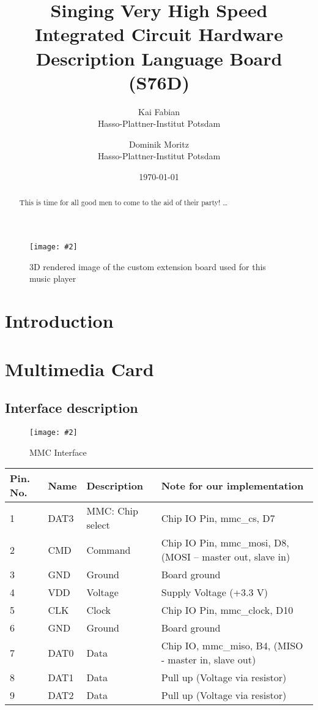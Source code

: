 \documentclass[12pt, a4paper]{article}
\title{Singing Very High Speed Integrated Circuit Hardware Description Language Board (S76D)}
\author{
        Kai Fabian \\
        Hasso-Plattner-Institut Potsdam\\
            \and
        Dominik Moritz \\
        Hasso-Plattner-Institut Potsdam\\
}
\date{\today}
\newcommand{\image}[5]{
	\begin{figure}[#4]               %
		\centering                     %
		\texttt{[image: \#2]} %
		\caption{#3}                   %
		\label{fig:#5}                 %
	\end{figure}                     %
}
\begin{document}
\maketitle

\image{0.7\textwidth}{render.png}{3D rendered image of the custom extension board used for this music player}{ht}{render}

\begin{abstract}
This is time for all good men to come to the aid of their party! \ldots
\end{abstract}

\tableofcontents

\section{Introduction}

\section{Multimedia Card}

\subsection{Interface description}

\image{0.3\textwidth}{../mmc_pins.png}{MMC Interface}{ht}{interface}

\begin{table}
    \begin{tabular}{|l|l|l|p{8cm}|}
    \hline
Pin. No.   & Name    & Description	    & Note for our implementation \\ \hline
1	       & DAT3	 & MMC: Chip select & Chip IO Pin, mmc\_cs, D7 \\
2	       & CMD	 & Command 	        & Chip IO Pin,  mmc\_mosi, D8, (MOSI – master out, slave in) \\
3	       & GND	 & Ground	        & Board ground \\
4	       & VDD	 & Voltage	        & Supply Voltage (+3.3 V) \\
5	       & CLK	 & Clock	        & Chip IO Pin,  mmc\_clock, D10 \\
6	       & GND	 & Ground	        & Board ground \\
7	       & DAT0	 & Data	            & Chip IO,  mmc\_miso, B4, (MISO - master in, slave out) \\
8	       & DAT1	 & Data	            & Pull up (Voltage via resistor) \\
9	       & DAT2	 & Data	            & Pull up (Voltage via resistor) \\
	\hline
    \end{tabular}
\end{table}
\end{document}
